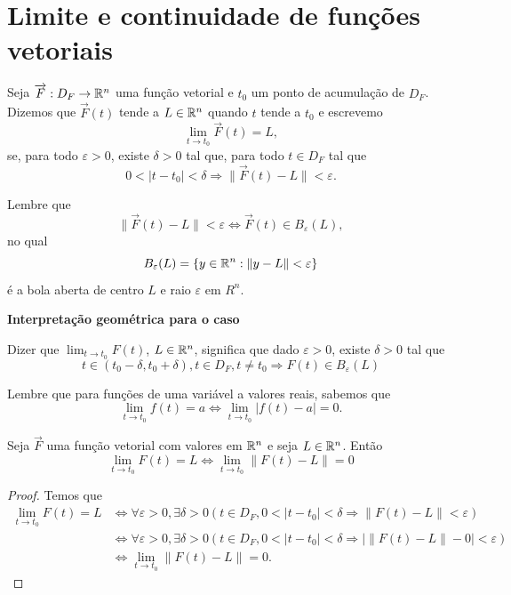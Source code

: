\section{Limite e continuidade de funções vetoriais}

\begin{definition}\label{Funções vetorias!Limite}
    Seja \(\overrightarrow{F}: D_F \to \mathbb{R}^n\) uma função vetorial e \(t_0\) um ponto de acumulação de \(D_F\). Dizemos que \(\overrightarrow{F}(t)\) tende a \(L\in\mathbb{R}^n\) quando \(t\) tende a \(t_0\) e escrevemo \[\lim_{t\to t_0} \overrightarrow{F}(t) = L,\] se, para todo \(\varepsilon>0\), existe \(\delta>0\) tal que, para todo \(t\in D_F\) tal que \[0 < |t-t_0| < \delta \Rightarrow \|\overrightarrow{F}(t) - L\| < \varepsilon.\]
\end{definition}

\begin{remark}
    Lembre que \[\|\overrightarrow{F}(t) - L\| < \varepsilon \Leftrightarrow \overrightarrow{F}(t) \in B_\varepsilon(L),\] no qual \[B_\varepsilon(L) = \{y\in\mathbb{R}^n : \|y-L\|<\varepsilon \} \] é a bola aberta de centro \(L\) e raio \(\varepsilon\) em \(R^n\).
\end{remark}

\textbf{Interpretação geométrica para o caso}

Dizer que \(\lim_{t\to t_0} F(t)\), \(L\in\mathbb{R}^n\), significa que dado \(\varepsilon>0\), existe \(\delta>0\) tal que \[t\in(t_0-\delta,t_0+\delta), t\in D_F, t\neq t_0 \Rightarrow F(t)\in B_\varepsilon(L)\]%

Lembre que para funções de uma variável a valores reais, sabemos que \[\lim_{t\to t_0} f(t) = a \Leftrightarrow \lim_{t\to t_0} |f(t) - a| = 0.\]

\begin{proposition}\label{prop.Limite0}
    Seja \(\overrightarrow{F}\) uma função vetorial com valores em \(\mathbb{R}^n\) e seja \(L\in\mathbb{R}^n\). Então \[\lim_{t\to t_0} F(t) = L \Leftrightarrow \lim_{t\to t_0} \|F(t) - L\| = 0\]
\end{proposition}

\begin{proof}
    Temos que
        \begin{align*}
            \lim_{t\to t_0} F(t) = L
                & \Leftrightarrow \forall \varepsilon>0, \exists \delta>0 (t\in D_F, 0<|t-t_0|<\delta \Rightarrow \|F(t) - L\|<\varepsilon) \\
                & \Leftrightarrow \forall \varepsilon>0, \exists \delta>0 (t\in D_F, 0<|t-t_0|<\delta \Rightarrow |\|F(t) - L\| - 0|<\varepsilon) \\
                & \Leftrightarrow \lim_{t\to t_0} \|F(t) - L\| = 0.
        \end{align*}
\end{proof}

